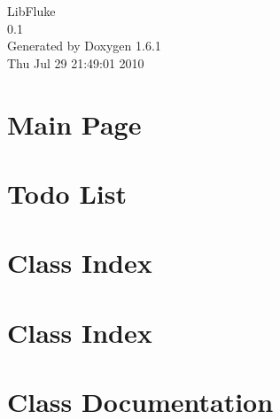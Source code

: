\documentclass[a4paper]{book}
\begin{document}
\hypersetup{pageanchor=false}
\begin{titlepage}
\vspace*{7cm}
\begin{center}
{\Large LibFluke \\[1ex]\large 0.1 }\\
\vspace*{1cm}
{\large Generated by Doxygen 1.6.1}\\
\vspace*{0.5cm}
{\small Thu Jul 29 21:49:01 2010}\\
\end{center}
\end{titlepage}
\clearemptydoublepage
{}
\tableofcontents
\clearemptydoublepage
{}
\hypersetup{pageanchor=true}
\chapter{Main Page}
\label{index}\hypertarget{index}{}
\chapter{Todo List}
\label{todo}
\hypertarget{todo}{}

\chapter{Class Index}

\chapter{Class Index}

\chapter{Class Documentation}
















\printindex
\end{document}
